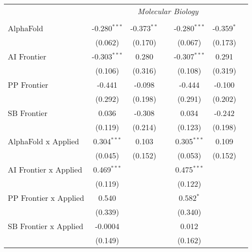 \begin{tabular}{lcccccc}
 & \multicolumn{6}{c}{\textit{Molecular Biology}} \\ \\
   AlphaFold                    & -0.280$^{***}$ & -0.373$^{**}$ &                & -0.280$^{***}$ & -0.359$^{*}$ &   \\   
                                & (0.062)        & (0.170)       &                & (0.067)        & (0.173)      &   \\   
   AI Frontier                  & -0.303$^{***}$ & 0.280         &                & -0.307$^{***}$ & 0.291        &   \\   
                                & (0.106)        & (0.316)       &                & (0.108)        & (0.319)      &   \\   
   PP Frontier                  & -0.441         & -0.098        &                & -0.444         & -0.100       &   \\   
                                & (0.292)        & (0.198)       &                & (0.291)        & (0.202)      &   \\   
   SB Frontier                  & 0.036          & -0.308        &                & 0.034          & -0.242       &   \\   
                                & (0.119)        & (0.214)       &                & (0.123)        & (0.198)      &   \\   
   AlphaFold x Applied          & 0.304$^{***}$  & 0.103         &                & 0.305$^{***}$  & 0.109        &   \\   
                                & (0.045)        & (0.152)       &                & (0.053)        & (0.152)      &   \\   
   AI Frontier x Applied        & 0.469$^{***}$  &               &                & 0.475$^{***}$  &              &   \\   
                                & (0.119)        &               &                & (0.122)        &              &   \\   
   PP Frontier x Applied        & 0.540          &               &                & 0.582$^{*}$    &              &   \\   
                                & (0.339)        &               &                & (0.340)        &              &   \\   
   SB Frontier x Applied        & -0.0004        &               &                & 0.012          &              &   \\   
                                & (0.149)        &               &                & (0.162)        &              &   \\   

\end{tabular}
